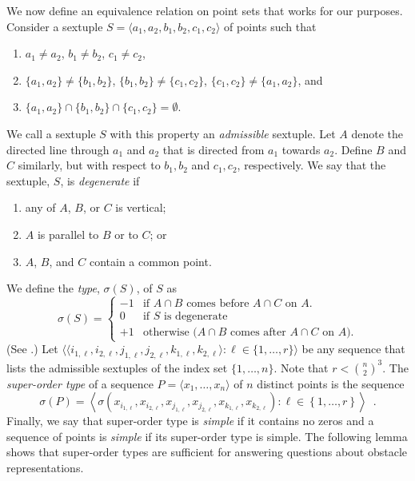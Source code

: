 \documentclass{patmorin}
\begin{document}
We now define an equivalence relation on point sets that works for our
purposes.  Consider a sextuple $S=\langle a_1,a_2,b_1,b_2,c_1,c_2\rangle$
of points such that
\begin{enumerate}
  \item  $a_1\neq a_2$, $b_1\neq b_2$, $c_1\neq c_2$, 
  \item  $\{a_1,a_2\}\neq \{b_1,b_2\}$, 
$\{b_1,b_2\}\neq \{c_1,c_2\}$, $\{c_1,c_2\}\neq \{a_1,a_2\}$, and 
  \item $\{a_1,a_2\}\cap\{b_1,b_2\}\cap\{c_1,c_2\}=\emptyset$.
\end{enumerate}
We call a sextuple $S$ with this property an \emph{admissible} sextuple.
Let $A$ denote the directed line through $a_1$ and $a_2$ that is directed
from $a_1$ towards $a_2$. Define $B$ and $C$ similarly, but with respect
to $b_1,b_2$ and $c_1,c_2$, respectively.  We say that the sextuple,
$S$, is \emph{degenerate} if
\begin{enumerate}
  \item any of $A$, $B$, or $C$ is vertical;
  \item $A$ is parallel to $B$ or to $C$; or
  \item $A$, $B$, and $C$ contain a common point.
\end{enumerate}
We define the \emph{type}, $\sigma(S)$, of $S$ as
\[
    \sigma(S) = \left\{\begin{array}{rl}
      -1 & \text{if $A\cap B$ comes before $A\cap C$ on $A$.} \\
      0 & \text{if $S$ is degenerate} \\
      +1 & \text{otherwise ($A\cap B$ comes after $A\cap C$ on $A$).} 
    \end{array}\right.
\]
(See .)  Let $\langle\langle
i_{1,\ell},i_{2,\ell},j_{1,\ell},j_{2,\ell},k_{1,\ell},k_{2,\ell}\rangle:
\ell \in \{1,\ldots,r\}\rangle$ be any sequence that lists the
admissible sextuples of the index set $\{1,\ldots,n\}$.  Note that $r<
\binom{n}{2}^3$.  The \emph{super-order type} of a sequence $P=\langle
x_1,\ldots,x_n\rangle$ of $n$ distinct points is the sequence
\[
   \sigma(P) = \left\langle \sigma\left(x_{i_{1,\ell}},x_{i_{2,\ell}},
       x_{j_{1,\ell}},x_{j_{2,\ell}},
       x_{k_{1,\ell}},x_{k_{2,\ell}}\right) : \ell\in\left\{1,\ldots,r\right\} \right\rangle \enspace .
\]
Finally, we say that super-order type is \emph{simple} if it contains
no zeros and a sequence of points is \emph{simple} if its super-order
type is simple.
The following lemma shows that super-order types are sufficient for answering
questions about obstacle representations.
\end{document}
